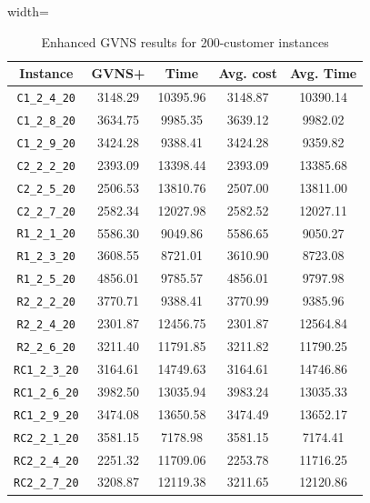 \documentclass{article}
\begin{document}
\begin{table}[ht]
\centering
\small
\setlength{\tabcolsep}{4pt}
\caption{Enhanced GVNS results for 200-customer instances}
\vspace{4mm}
\begin{adjustbox}{width=\textwidth}
\begin{tabular}{c c c c c}
\toprule
Instance & GVNS+ & Time & Avg. cost & Avg. Time \\
\midrule
\texttt{C1\_2\_4\_20} & 3148.29 & 10395.96 & 3148.87 & 10390.14 \\
\texttt{C1\_2\_8\_20} & 3634.75 & 9985.35 & 3639.12 & 9982.02 \\
\texttt{C1\_2\_9\_20} & 3424.28 & 9388.41 & 3424.28 & 9359.82 \\
\texttt{C2\_2\_2\_20} & 2393.09 & 13398.44 & 2393.09 & 13385.68 \\
\texttt{C2\_2\_5\_20} & 2506.53 & 13810.76 & 2507.00 & 13811.00 \\
\texttt{C2\_2\_7\_20} & 2582.34 & 12027.98 & 2582.52 & 12027.11 \\
\texttt{R1\_2\_1\_20} & 5586.30 & 9049.86 & 5586.65 & 9050.27 \\
\texttt{R1\_2\_3\_20} & 3608.55 & 8721.01 & 3610.90 & 8723.08 \\
\texttt{R1\_2\_5\_20} & 4856.01 & 9785.57 & 4856.01 & 9797.98 \\
\texttt{R2\_2\_2\_20} & 3770.71 & 9388.41 & 3770.99 & 9385.96 \\
\texttt{R2\_2\_4\_20} & 2301.87 & 12456.75 & 2301.87 & 12564.84 \\
\texttt{R2\_2\_6\_20} & 3211.40 & 11791.85 & 3211.82 & 11790.25 \\
\texttt{RC1\_2\_3\_20} & 3164.61 & 14749.63 & 3164.61 & 14746.86 \\
\texttt{RC1\_2\_6\_20} & 3982.50 & 13035.94 & 3983.24 & 13035.33 \\
\texttt{RC1\_2\_9\_20} & 3474.08 & 13650.58 & 3474.49 & 13652.17 \\
\texttt{RC2\_2\_1\_20} & 3581.15 & 7178.98 & 3581.15 & 7174.41 \\
\texttt{RC2\_2\_4\_20} & 2251.32 & 11709.06 & 2253.78 & 11716.25 \\
\texttt{RC2\_2\_7\_20} & 3208.87 & 12119.38 & 3211.65 & 12120.86 \\
\bottomrule
\end{tabular}
\end{adjustbox}
\end{table}
\end{document}
